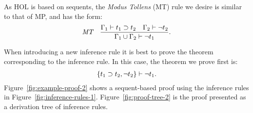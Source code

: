 As HOL is based on sequents, the \emph{Modus Tollens} (MT) rule we
desire is similar to that of MP, and has the form:
\begin{gather*}
  \irule
  {\seqs{\Gamma_1}{t_1 \implies t_2} \quad \seqs{\Gamma_2}{\neg t_2}}
  {\seqs{\Gamma_1 \cup \Gamma_2}{\neg t_1}}
  {MT}.
\end{gather*}

When introducing a new inference rule it is best to prove the theorem
corresponding to the inference rule.  In this case, the theorem we
prove first is:
\begin{gather*}
  \seq{t_1 \implies t_2, \neg t_2}{\neg t_1}.
\end{gather*}
Figure~\ref{fig:example-proof-2} shows a sequent-based proof using the
inference rules in Figure~\ref{fig:inference-rules-1}.
Figure~\ref{fig:proof-tree-2} is the proof presented as a derivation
tree of inference rules.



